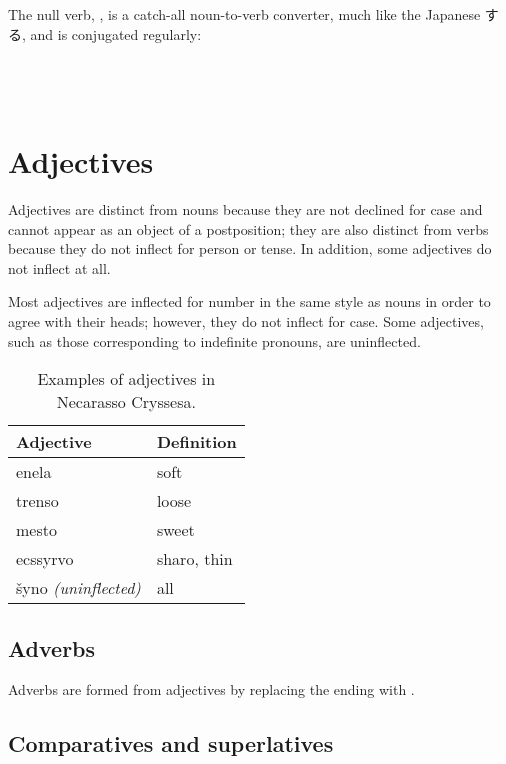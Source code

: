 \documentclass{book}
\begin{document}
The null verb, , is a catch-all noun-to-verb converter, much like the Japanese \textsf{する}, and is conjugated regularly: \\
~\\
    \\
    \\
  

\chapter{Adjectives}

Adjectives are distinct from nouns because they are not declined for case and cannot appear as an object of a postposition; they are also distinct from verbs because they do not inflect for person or tense. In addition, some adjectives do not inflect at all.

Most adjectives are inflected for number in the same style as nouns in order to agree with their heads; however, they do not inflect for case. Some adjectives, such as those corresponding to indefinite pronouns, are uninflected.

\begin{table}[h]
  \caption{Examples of adjectives in Necarasso Cryssesa.}
  \centering
  \begin{tabular}{|l|l|}
    \hline
    Adjective & Definition \\
    \hline
    enela & soft \\
    trenso & loose \\
    mesto & sweet \\
    ecssyrvo & sharo, thin \\
    šyno \emph{(uninflected)} & all \\
    \hline
  \end{tabular}
\end{table}

\section{Adverbs}
\label{sec:adverbs}

Adverbs are formed from adjectives by replacing the ending with .

\section{Comparatives and superlatives}
\end{document}
